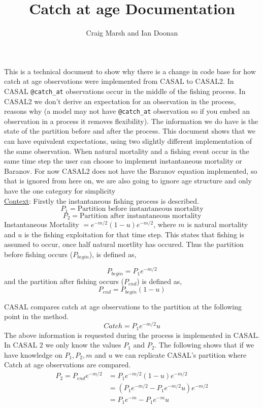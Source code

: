\documentclass{article}
\makeatletter
\newcommand{\command}[1] {\texttt{@#1}}
\makeatother
\begin{document}
	\title{Catch at age Documentation}
	\author{Craig Marsh and Ian Doonan}
	\maketitle
	
	This is a technical document to show why there is a change in code base for how catch at age observations were implemented from CASAL to CASAL2. In CASAL \texttt{\command catch\_at} observations occur in the middle of the fishing process. In CASAL2 we don't derive an expectation for an observation in the process, reasons why (a model may not have \texttt{\command catch\_at} observation so if you embed an observation in a process it removes flexibility). The information we do have is the state of the partition before and after the process. This document shows that we can have equivalent expectations, using two slightly different implementation of the same observation. When natural mortality and a fishing event occur in the same time step the user can choose to implement instantaneous mortality or Baranov. For now CASAL2 does not have the Baranov equation implemented, so that is ignored from here on, we are also going to ignore age structure and only have the one category for simplicity\\
	
	\underline{Context}: Firstly the instantaneous fishing process is described. \\
				$$P_1 = \text{Partition before instantaneous mortality}$$
				$$P_2 = \text{Partition after instantaneous mortality}$$
				Instantaneous Mortality  $= e^{-m/2}(1-u)e^{-m/2}$, where $m$ is natural mortality and $u$ is the fishing exploitation for that time step. This states that fishing is assumed to occur, once half natural mortlity has occured. Thus the partition before fishing occurs ($P_{begin}$), is defined as,
				
				$$P_{begin} = P_1e^{-m/2}$$
				and the partition after fishing occurs ($P_{end}$) is defined as,
				\begin{equation}\label{eq:cas}
				P_{end} = P_{begin}(1-u)
				\end{equation}

				
	CASAL compares catch at age observations to the partition at the following point in the method.
	 $$Catch = P_1e^{-m/2}u$$
	The above information is requested during the process is implemented in CASAL. In CASAL 2 we only know the values $P_1$ and $P_2$. The following shows that if we have knowledge on $P_1, P_2, m$ and $u$ we can replicate CASAL's partition where Catch at age observations are compared. 
		\begin{equation}
		\begin{split}
			P_2 = P_{end}e^{-m/2} & = P_1e^{-m/2}(1-u)e^{-m/2}\\
			& = (P_1e^{-m/2} - P_1e^{-m/2}u)e^{-m/2}\\
			& = P_1e^{-m} - P_1e^{-m}u\\	
		\end{split}
		\end{equation}
\end{document}
